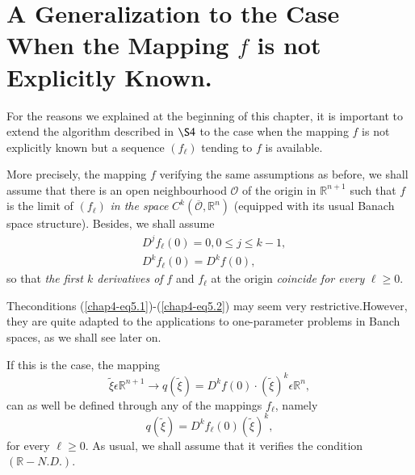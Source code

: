 \section[A Generalization to the Case.....]{A Generalization to the Case When the Mapping $f$ is not  Explicitly Known.}\label{chap4-sec5} 

For the reasons we explained at the beginning of this chapter, it is
important to extend the algorithm described in $\S 4$ to the case when
the mapping $f$ is not explicitly known but a sequence $(f_{\ell})$
tending to $f$ is available.

More precisely, the mapping $f$ verifying the same assumptions as
before, we shall assume that there is an open neighbourhood
$\mathscr{O}$ of the origin in $\mathbb{R}^{n+1}$ such that $f$ is the
limit of $(f_{\ell})$ {\em in the space}
$C^{k}(\overline{\mathscr{O}}, \mathbb{R}^{n})$ (equipped with its
usual Banach space structure). Besides, we shall assume
\begin{align*}
& D^{j}f_{\ell}(0) = 0, 0 \leq j \leq
  k-1,\tag{5.1}\label{chap4-eq5.1}\\
& D^{k}f_{\ell}(0) = D^{k}f(0),\tag{5.2}\label{chap4-eq5.2}
\end{align*}
so that {\em the first $k$ derivatives of} $f$ and $f_{\ell}$ at the
origin {\em coincide for every} $\ell \geq 0$.

\begin{remark}\label{chap4-rem5.1}
The\pageoriginale conditions (\ref{chap4-eq5.1})-(\ref{chap4-eq5.2})
may seem very restrictive.\break However, they are quite adapted to the
applications to one-parameter problems in Banch spaces, as we shall
see later on.
\end{remark}

If this is the case, the mapping
\begin{equation*}
\widetilde{\xi} \epsilon \mathbb{R}^{n+1} \to q(\widetilde{\xi}) =
D^{k}f(0) \cdot (\widetilde{\xi})^{k} \epsilon \mathbb{R}^{n},\tag{5.3}\label{chap4-eq5.3}
\end{equation*}
can as well be defined through any of the mappings $f_{\ell}$, namely
\begin{equation*}
q(\widetilde{\xi}) = D^{k}f_{\ell}(0) (\widetilde{\xi})^{k},\tag{5.4}\label{chap4-eq5.4}
\end{equation*}
for every $\ell \geq 0$. As usual, we shall assume that it verifies
the condition $(\mathbb{R}-N.D.)$.

